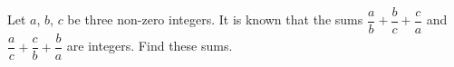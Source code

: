 \documentclass[varwidth]{standalone}
\begin{document}
    Let $a$, $b$, $c$ be three non-zero integers. It is known that the sums $\dfrac{a}{b} + \dfrac{b}{c} + \dfrac{c}{a}$ and $\dfrac{a}{c} + \dfrac{c}{b} + \dfrac{b}{a}$ are integers. Find these sums.
\end{document}
